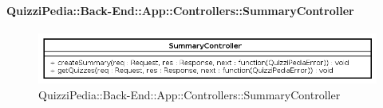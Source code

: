 \paragraph{QuizziPedia::Back-End::App::Controllers::SummaryController}
\label{QuizziPedia::Back-End::App::Controllers::SummaryController}
\begin{figure}[ht]
	\centering
	\includegraphics[scale=0.6]{UML/Classi/Back-End/QuizziPedia_Back-End_App_Controllers_SummaryController.png}
	\caption{QuizziPedia::Back-End::App::Controllers::SummaryController}
\end{figure}
\FloatBarrier

